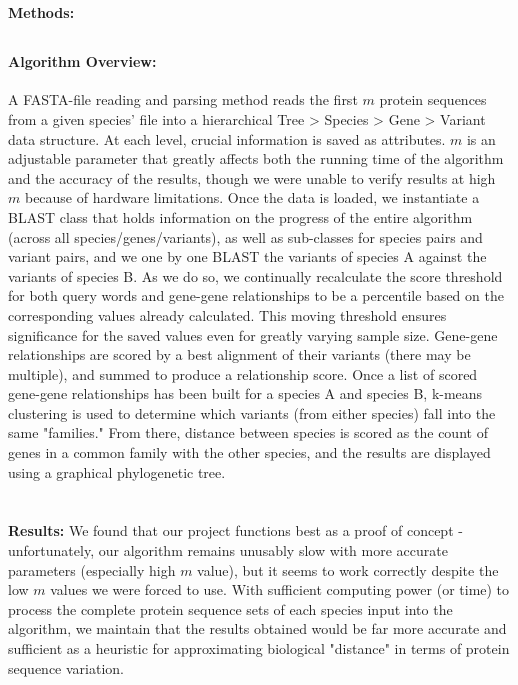 \documentclass[11pt, oneside]{article}
\begin{document}
\pagebreak
\section{}
{\bfseries Methods:}

\subsection{}
\paragraph
{\bfseries Algorithm Overview:} A FASTA-file reading and parsing method reads the first $m$ protein sequences from a given species' file into a hierarchical Tree > Species > Gene > Variant data structure. At each level, crucial information is saved as attributes. $m$ is an adjustable parameter that greatly affects both the running time of the algorithm and the accuracy of the results, though we were unable to verify results at high $m$ because of hardware limitations. Once the data is loaded, we instantiate a BLAST class that holds information on the progress of the entire algorithm (across all species/genes/variants), as well as sub-classes for species pairs and variant pairs, and we one by one BLAST the variants of species A against the variants of species B. As we do so, we continually recalculate the score threshold for both query words and gene-gene relationships to be a percentile based on the corresponding values already calculated. This moving threshold ensures significance for the saved values even for greatly varying sample size. Gene-gene relationships are scored by a best alignment of their variants (there may be multiple), and summed to produce a relationship score. Once a list of scored gene-gene relationships has been built for a species A and species B, k-means clustering is used to determine which variants (from either species) fall into the same "families." From there, distance between species is scored as the count of genes in a common family with the other species, and the results are displayed using a graphical phylogenetic tree. 

\pagebreak
\section{}
{\bfseries Results:} We found that our project functions best as a proof of concept - unfortunately, our algorithm remains unusably slow with more accurate parameters (especially high $m$ value), but it seems to work correctly despite the low $m$ values we were forced to use. With sufficient computing power (or time) to process the complete protein sequence sets of each species input into the algorithm, we maintain that the results obtained would be far more accurate and sufficient as a heuristic for approximating biological "distance" in terms of protein sequence variation.
\end{document}
